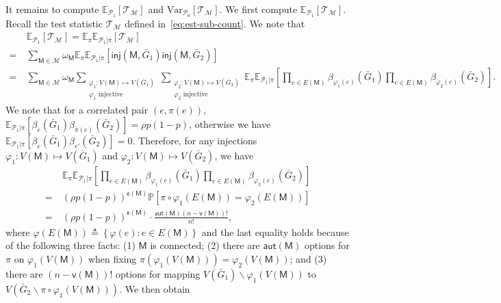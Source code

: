 \documentclass[letterpaper,11pt]{article}
\theoremstyle{definition}
\newcommand{\maM}{\mathcal{M}}
\newcommand{\maP}{\mathcal{P}}
\newcommand{\maT}{\mathcal{T}}
\newcommand{\prob}[1]{ \mathbb{P}\left[ #1 \right] }
\newcommand{\en}{\mathsf{{e}}}
\newcommand{\vn}{\mathsf{{v}}}
\newcommand{\pth}[1]{\left( #1 \right)}
\newcommand{\qth}[1]{\left[ #1 \right]}
\newcommand{\sth}[1]{\left\{ #1 \right\}}
\newcommand{\sfM}{{\mathsf{M}}}
\newcommand{\aut}{\mathsf{aut}}
\newcommand{\inj}{\mathsf{inj}}
\newcommand{\vp}{\varphi}
\def\var{\mathrm{Var}}
\def\E{\mathbb{E}}
\begin{document}
It remains to compute $\E_{\maP_1}\qth{\maT_{\maM}}$ and $\var_{\maP_0}\qth{\maT_{\maM}}$. We first compute $\E_{\maP_1}\qth{\maT_{\maM}}$. Recall the test statistic $\maT_\maM$ defined in~\eqref{eq:est-sub-count}.
We note that \begin{align*}
    &~\E_{\maP_1}\qth{\maT_{\maM}} = \E_{\pi}\E_{\maP_1|\pi}\qth{\maT_{\maM}}\\
    =&~\sum_{\sfM\in \maM} \omega_\sfM \E_\pi\E_{\maP_1|\pi}\qth{\inj(\sfM,\bar{G}_1) \inj(\sfM,\bar{G}_2)}\\
    =&~\sum_{\sfM\in \maM}\omega_\sfM\sum_{\substack{\varphi_1:V(\sfM)\mapsto V(\bar{G}_1)\\\varphi_1\text{  injective}}}\sum_{\substack{\varphi_2:V(\sfM)\mapsto V(\bar{G}_2)\\\varphi_2\text{ injective}}} \E_\pi\E_{\maP_1|\pi}\qth{\prod_{e\in E(\sfM)} \beta_{\varphi_1(e)}(\bar{G}_1)\prod_{e\in E(\sfM)} \beta_{\varphi_2(e)}(\bar{G}_2)}.
\end{align*}
We note that for a correlated pair $(e,\pi(e))$, $\E_{\maP_1|\pi} \qth{\beta_e(\bar{G}_1)\beta_{\pi(e)}(\bar{G}_2)} = \rho p (1-p)$, otherwise we have $\E_{\maP_1|\pi} \qth{\beta_e(\bar{G}_1)\beta_{e'}(\bar{G}_2)} = 0$. Therefore, for any injections $\vp_1:V(\sfM)\mapsto V(\bar{G}_1)$ and $\vp_2:V(\sfM)\mapsto V(\bar{G}_2)$, we have \begin{align}
    \nonumber \nonumber&~\E_\pi\E_{\maP_1|\pi}\qth{\prod_{e\in E(\sfM)} \beta_{\vp_1(e)}(\bar{G}_1)\prod_{e\in E(\sfM)} \beta_{\vp_2(e)}(\bar{G}_2)} \\\nonumber =&~ \pth{\rho p (1-p)}^{\en(\sfM)}\prob{\pi\circ \vp_1(E(\sfM)) = \vp_2(E(\sfM))}\\\label{eq:Epvarphi12} 
    =&~\pth{\rho p (1-p)}^{\en(\sfM)}\cdot \frac{\aut(\sfM)(n-\vn(\sfM))!}{n!},
\end{align}
where $\vp(E(\sfM))\triangleq \sth{\vp(e):e\in E(\sfM)}$ and the last equality holds because of the following three facts: (1) $\sfM$ is connected; (2) there are $\aut(\sfM)$ options for $\pi$ on $\vp_1(V(\sfM))$ when fixing $\pi(\vp_1(V(\sfM))) = \vp_2(V(\sfM))$; and (3) there are $(n-\vn(\sfM))!$ options for mapping $V(\bar{G}_1)\backslash \vp_1(V(\sfM))$ to $V(\bar{G}_2\backslash \pi\circ\vp_1(V(\sfM)))$. We then obtain
\end{document}

